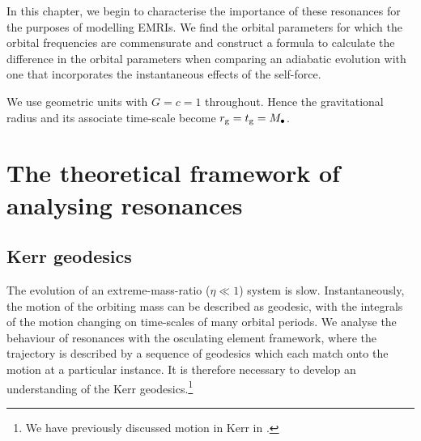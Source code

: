 In this chapter, we begin to characterise the importance of these resonances for the purposes of modelling EMRIs. We find the orbital parameters for which the orbital frequencies are commensurate and construct a formula to calculate the difference in the orbital parameters when comparing an adiabatic evolution with one that incorporates the instantaneous effects of the self-force.

We use geometric units with $G = c = 1$ throughout. Hence the gravitational radius and its associate time-scale become $r_\mathrm{g} = t_\mathrm{g} = M_\bullet$.

\section{The theoretical framework of analysing resonances}

\subsection{Kerr geodesics}

The evolution of an extreme-mass-ratio ($\eta \ll 1$) system is slow. Instantaneously, the motion of the orbiting mass can be described as geodesic, with the integrals of the motion changing on time-scales of many orbital periods. We analyse the behaviour of resonances with the osculating element framework, where the trajectory is described by a sequence of geodesics which each match onto the motion at a particular instance. It is therefore necessary to develop an understanding of the Kerr geodesics.\footnote{We have previously discussed motion in Kerr in .}

